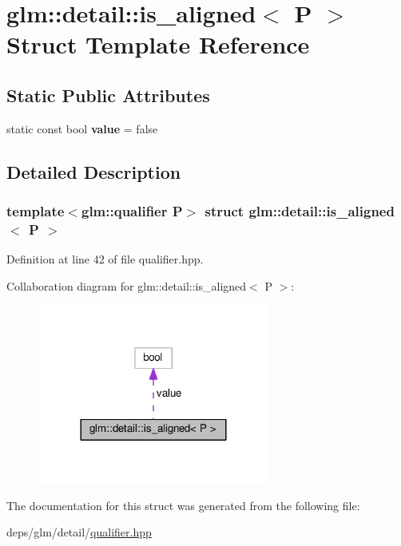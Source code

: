 \hypertarget{structglm_1_1detail_1_1is__aligned}{}\section{glm\+:\+:detail\+:\+:is\+\_\+aligned$<$ P $>$ Struct Template Reference}
\label{structglm_1_1detail_1_1is__aligned}
\subsection*{Static Public Attributes}
\begin{DoxyCompactItemize}
\item 
\mbox{\label{structglm_1_1detail_1_1is__aligned_ac46592cb8bac0221314181e0143aa265}} 
static const bool {\bfseries value} = false
\end{DoxyCompactItemize}


\subsection{Detailed Description}
\subsubsection*{template$<$glm\+::qualifier P$>$\newline
struct glm\+::detail\+::is\+\_\+aligned$<$ P $>$}



Definition at line 42 of file qualifier.\+hpp.



Collaboration diagram for glm\+:\+:detail\+:\+:is\+\_\+aligned$<$ P $>$\+:
\nopagebreak
\begin{figure}[H]
\begin{center}
\leavevmode
\includegraphics[width=216pt]{d5/d6d/structglm_1_1detail_1_1is__aligned__coll__graph}
\end{center}
\end{figure}


The documentation for this struct was generated from the following file\+:\begin{DoxyCompactItemize}
\item 
deps/glm/detail/\hyperlink{qualifier_8hpp}{qualifier.\+hpp}\end{DoxyCompactItemize}
